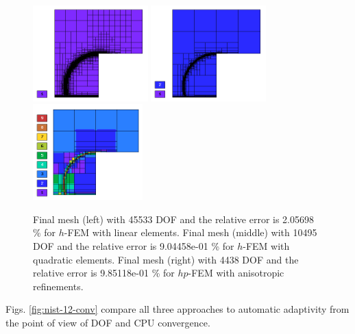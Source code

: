 \documentclass[12pt]{elsarticle}
\begin{document}
\begin{figure}[H]
\centering
\vspace{-3mm}
\includegraphics[height=3.7cm]{nist/nist-12/mesh_h1_aniso.png}
\includegraphics[height=3.7cm]{nist/nist-12/mesh_h2_aniso.png}
\includegraphics[height=3.7cm]{nist/nist-12/mesh_hp_aniso.png}
\vspace{-3mm}
\caption{
Final mesh (left) with 45533 DOF and the relative error is 2.05698 \% for $h$-FEM with linear elements.
Final mesh (middle) with 10495 DOF and the relative error is 9.04458e-01 \% for $h$-FEM with quadratic elements.
Final mesh (right) with 4438 DOF and the relative error is 9.85118e-01 \% for $hp$-FEM with anisotropic refinements.}
\vspace{-3mm}
\label{fig:nist-12-hp-aniso}
\end{figure}

Figs. \ref{fig:nist-12-conv} compare all
three approaches to automatic adaptivity from the point
of view of DOF and CPU convergence.
\vspace{-2mm}
\end{document}
